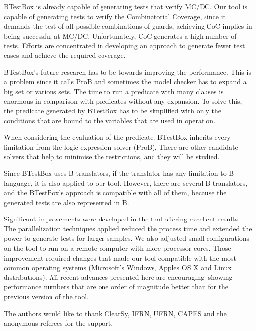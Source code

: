 \documentclass[runningheads]{llncs}
\begin{document}
BTestBox is already capable of generating tests that verify MC/DC. Our tool is capable of generating tests to verify the Combinatorial Coverage, since it demands the test of all possible combinations of guards, achieving CoC implies in being successful at MC/DC. Unfortunately, CoC generates a high number of tests. Efforts are concentrated in developing an approach to generate fewer test cases and achieve the required coverage.

BTestBox's future research has to be towards improving the performance. This is a problem since it calls ProB and sometimes the model checker has to expand a big set or various sets. The time to run a predicate with many clauses is enormous in comparison with predicates without any expansion. To solve this, the predicate generated by BTestBox has to be simplified with only the conditions that are bound to the variables that are used in operation.

When considering the evaluation of the predicate, BTestBox inherits every limitation from the logic expression solver (ProB). There are other candidate solvers that help to minimise the restrictions, and they will be studied.

Since BTestBox uses B translators, if the translator has any limitation to B language, it is also applied to our tool. However, there are several B translators, and the BTestBox's approach is compatible with all of them, because the generated tests are also represented in B. 

Significant improvements were developed in the tool offering excellent results.
The parallelization techniques applied reduced the process time and extended the power to generate tests for larger samples. We also adjusted small configurations on the tool to run on a remote computer with more processor cores. Those improvement required changes that made our tool compatible with the most common operating systems (Microsoft’s Windows, Apple\textquotesingle s OS X and Linux distributions). All recent advances presented here are encouraging, showing performance numbers that are one order of magnitude better than for the previous version of the tool.

The authors would like to thank ClearSy, IFRN, UFRN, CAPES and the anonymous referees for the support.




%
%
%




 
\end{document}

